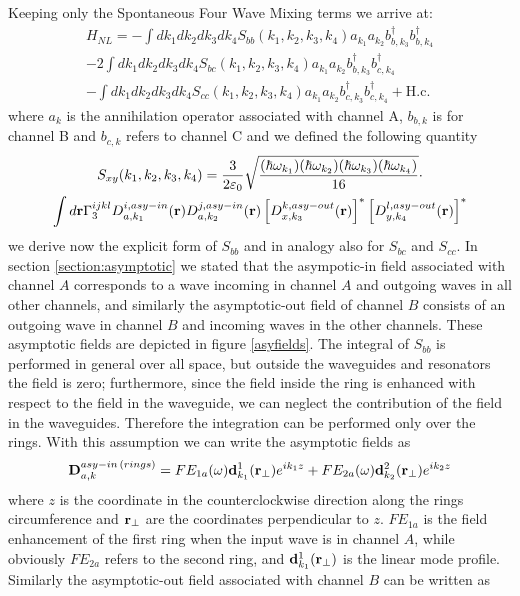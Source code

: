 Keeping only the Spontaneous Four Wave Mixing terms we arrive at:
\begin{multline}H_{NL} = -\int dk_1dk_2dk_3dk_4S_{bb}(k_1,k_2,k_3,k_4)a_{k_1}a_{k_2}b_{b,k_3}^\dagger b_{b,k_4}^\dagger \\-2\int dk_1dk_2dk_3dk_4S_{bc}(k_1,k_2,k_3,k_4)a_{k_1}a_{k_2}b_{b,k_3}^\dagger b_{c,k_4}^\dagger\\ -\int dk_1dk_2dk_3dk_4S_{cc}(k_1,k_2,k_3,k_4)a_{k_1}a_{k_2}b_{c,k_3}^\dagger b_{c,k_4}^\dagger +\text{H.c.}\end{multline}
where $a_k$ is the annihilation operator associated with channel A, $b_{b,k}$ is for channel B and $b_{c,k}$ refers to channel C and we defined the following quantity
\begin{multline}\label{S}
S_{xy}(k_1,k_2,k_3,k_4) = \frac{3}{2\varepsilon_0}\sqrt{\frac{(\hbar\omega_{k_1})(\hbar\omega_{k_2})(\hbar\omega_{k_3})(\hbar\omega_{k_4})}{16}}\cdot \\ \int d\mathbf{r} \Gamma^{ijkl}_3D^{i,asy-in}_{a,k_1}(\mathbf{r})D^{j,asy-in}_{a,k_2}(\mathbf{r})\left[D^{k,asy-out}_{x,k_3}(\mathbf{r})\right]^*\left[D^{l,asy-out}_{y,k_4}(\mathbf{r})\right]^*
\end{multline}
we derive now the explicit form of $S_{bb}$ and in analogy also for $S_{bc}$ and $S_{cc}$. In section \ref{section:asymptotic} we stated that the asympotic-in field associated with channel $A$ corresponds to a wave incoming in channel $A$ and outgoing waves in all other channels, and similarly the asymptotic-out field of channel $B$ consists of an outgoing wave in channel $B$ and incoming waves in the other channels. These asymptotic fields are depicted in figure \ref{asyfields}. The integral of $S_{bb}$ is performed in general over all space, but outside the waveguides and resonators the field is zero; furthermore, since the field inside the ring is enhanced with respect to the field in the waveguide, we can neglect the contribution of the field in the waveguides. Therefore the integration can be performed only over the rings. With this assumption we can write the asymptotic fields as
\begin{equation}\mathbf{D}^{asy-in\,(rings)}_{a,k} = FE_{1a}(\omega) \mathbf{d}^1_{k_1}(\mathbf{r}_\perp)e^{ik_1z} + FE_{2a}(\omega) \mathbf{d}_{k_2}^2(\mathbf{r}_\perp)e^{ik_2z} \end{equation}
where $z$ is the coordinate in the counterclockwise direction along the rings circumference and $\mathbf{r}_\perp$ are the coordinates perpendicular to $z$. $FE_{1a}$ is the field enhancement of the first ring when the input wave is in channel $A$, while obviously $FE_{2a}$ refers to the second ring, and $\mathbf{d}^1_{k_1}(\mathbf{r}_\perp)$ is the linear mode profile. Similarly the asymptotic-out field associated with channel $B$ can be written as
